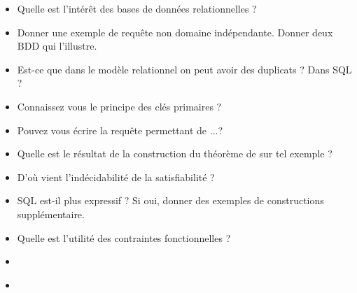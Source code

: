 \documentclass{agregfiche}
\begin{document}
\secquestionsclassiques

\begin{itemize}
    \item Quelle est l'intérêt des bases de données relationnelles ?
	\item Donner une exemple de requête non domaine indépendante. 
	Donner deux BDD qui l'illustre.
    \item Est-ce que dans le modèle relationnel on peut avoir des 
    duplicats ? Dans SQL ?
    \item Connaissez vous le principe des clés primaires ?
    \item Pouvez vous écrire la requête permettant de ...?
    \item Quelle est le résultat de la construction du théorème de 
     sur tel exemple ?
    \item D'où vient l'indécidabilité de la satisfiabilité ?
    \item SQL est-il plus expressif ? Si oui, donner des exemples de 
    constructions supplémentaire.
    \item Quelle est l'utilité des contraintes fonctionnelles ?
\end{itemize}

\secreferences

\begin{itemize}
\item 
\end{itemize}

\secdev

\begin{itemize}
\item 
\end{itemize}
\end{document}
